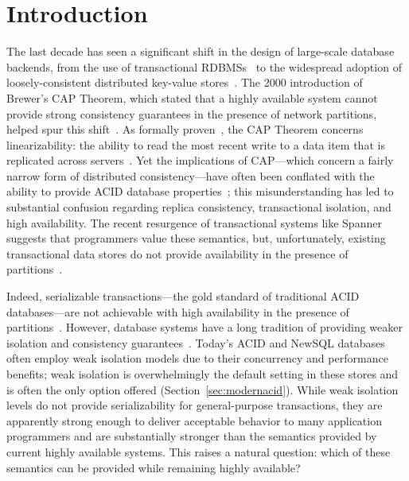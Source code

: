 
\section{Introduction}

The last decade has seen a significant shift in the design of
large-scale database backends, from the use of transactional
RDBMSs~\cite{bernstein-book, gray-isolation, gray-virtues} to the
widespread adoption of loosely-consistent distributed key-value
stores~\cite{bigtable, pnuts, dynamo}. The 2000 introduction of
Brewer's CAP Theorem, which stated that a highly available system
cannot provide strong consistency guarantees in the presence of
network partitions, helped spur this shift~\cite{brewer-slides}. As
formally proven~\cite{gilbert-cap}, the CAP Theorem concerns
linearizability: the ability to read the most recent write to a data
item that is replicated across servers~\cite{herlihy-art}. Yet the
implications of CAP---which concern a fairly narrow form of
distributed consistency---have often been conflated with the ability
to provide ACID database properties~\cite{brewer-slides, hn,
  foundation-article}; this misunderstanding has led to substantial
confusion regarding replica consistency, transactional isolation, and
high availability. The recent resurgence of transactional systems like
Spanner~\cite{spanner} suggests that programmers value these
semantics, but, unfortunately, existing transactional data stores do
not provide availability in the presence of
partitions~\cite{middleware-db, foundation-article,
  hstore,generalizedsnapshot, mdcc, krikellas-bargain, eiger, walter,
  calvin}.

Indeed, serializable transactions---the gold standard of traditional
ACID databases---are not achievable with high availability in the
presence of partitions~\cite{davidson-survey}. However, database
systems have a long tradition of providing weaker isolation and
consistency guarantees~\cite{adya, ansicritique, gray-virtues,
  gray-isolation, kemme-thesis}. Today's ACID and NewSQL databases
often employ weak isolation models due to their concurrency and
performance benefits; weak isolation is overwhelmingly the default
setting in these stores and is often the only option offered
(Section~\ref{sec:modernacid}). While weak isolation levels do not
provide serializability for general-purpose transactions, they are
apparently strong enough to deliver acceptable behavior to many
application programmers and are substantially stronger than the
semantics provided by current highly available systems. This raises a
natural question: which of these semantics can be provided while
remaining highly available?

